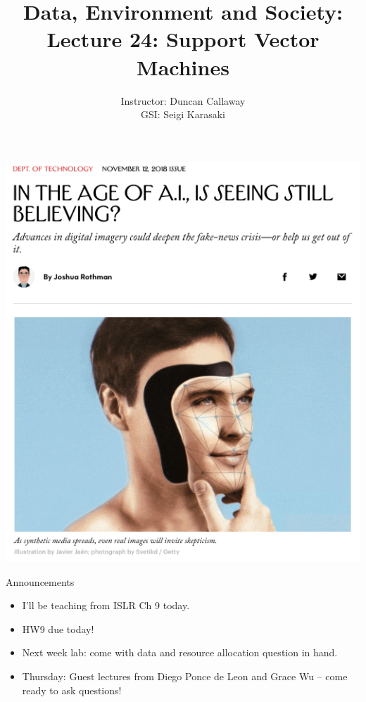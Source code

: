 \documentclass[mathserif, aspectratio=169]{beamer}
\title[Lecture 23] %
{Data, Environment and Society: \\{Lecture 24: Support Vector Machines}}
\author[ER190C: Data, Environment and Society] 
{Instructor: Duncan Callaway\\
GSI: Seigi Karasaki}
\institute[UC Berkeley] %
 {\small{ \bf November 13, 2018}}
\date[November 13, 2018]
\begin{document}
\frame{
  \titlepage
}

\begin{frame}{}
\includegraphics[height=\textheight]{new_yorker}
\end{frame}

\begin{frame}{Announcements}

\begin{itemize}
\item I'll be teaching from ISLR Ch 9 today.
\item HW9 due today!
\item Next week lab: come with data and resource allocation question in hand.
\item Thursday: Guest lectures from Diego Ponce de Leon and Grace Wu -- come ready to ask questions!
\end{itemize}

\end{frame}
\end{document}
